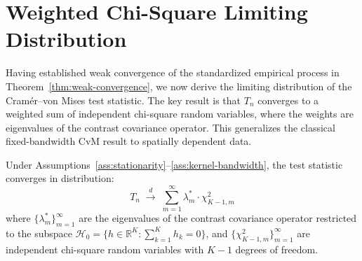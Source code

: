 
\section{Weighted Chi-Square Limiting Distribution}
\label{sec:weighted-chi-square}

Having established weak convergence of the standardized empirical process in Theorem~\ref{thm:weak-convergence}, we now derive the limiting distribution of the Cram\'{e}r--von Mises test statistic. The key result is that $T_n$ converges to a weighted sum of independent chi-square random variables, where the weights are eigenvalues of the contrast covariance operator. This generalizes the classical fixed-bandwidth CvM result to spatially dependent data.

\begin{theorem}\label{thm:weighted-chisq}
Under Assumptions~\ref{ass:stationarity}--\ref{ass:kernel-bandwidth}, the test statistic converges in distribution:
\begin{equation}
T_n \;\xrightarrow{d}\; \sum_{m=1}^{\infty} \lambda_m^* \cdot \chi^2_{K-1,m}
\end{equation}
where $\{\lambda_m^*\}_{m=1}^{\infty}$ are the eigenvalues of the contrast covariance operator restricted to the subspace $\mathcal{H}_0 = \{h \in \mathbb{R}^K : \sum_{k=1}^K h_k = 0\}$, and $\{\chi^2_{K-1,m}\}_{m=1}^{\infty}$ are independent chi-square random variables with $K-1$ degrees of freedom.
\end{theorem}

